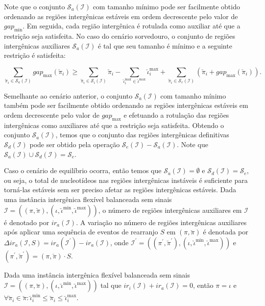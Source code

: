 Note que o conjunto $\mathcal{S}_{a}(\mathcal{I})$ com tamanho mínimo pode ser facilmente obtido ordenando as regiões intergênicas estáveis em ordem decrescente pelo valor de $gap_{\min}$. Em seguida, cada região intergênica é rotulada como auxiliar até que a restrição seja satisfeita. No caso do cenário sorvedouro, o conjunto de regiões intergênicas auxiliares $\mathcal{S}_{a}(\mathcal{I})$ é tal que seu tamanho é mínimo e a seguinte restrição é satisfeita:

$$\sum_{\breve\pi_i \in \mathcal{S}_{a}(\mathcal{I})} gap_{\max}(\breve\pi_i) \ge \sum_{\breve\pi_i \in \mathcal{S}_{i}(\mathcal{I})} \breve\pi_i - \sum_{\breve\iota_{i}^{\max}  \in \breve\iota^{\max}} \breve\iota_{i}^{\max} + \sum_{\breve\pi_i \in \mathcal{S}_{e}(\mathcal{I})} (\breve\pi_i + gap_{\max}(\breve\pi_i)).$$

Semelhante ao cenário anterior, o conjunto $\mathcal{S}_{a}(\mathcal{I})$ com tamanho mínimo também pode ser facilmente obtido ordenando as regiões intergênicas estáveis em ordem decrescente pelo valor de $gap_{\max}$ e efetuando a rotulação das regiões intergênicas como auxiliares até que a restrição seja satisfeita. Obtendo o conjunto $\mathcal{S}_{a}(\mathcal{I})$, temos que o conjunto das regiões intergênicas definitivas $\mathcal{S}_{d}(\mathcal{I})$ pode ser obtido pela operação $\mathcal{S}_{e}(\mathcal{I}) - \mathcal{S}_{a}(\mathcal{I})$. Note que $\mathcal{S}_{a}(\mathcal{I}) \cup \mathcal{S}_{d}(\mathcal{I}) = \mathcal{S}_{e}$.

Caso o cenário de equilíbrio ocorra, então temos que $\mathcal{S}_{a}(\mathcal{I})=\emptyset$ e $ \mathcal{S}_{d}(\mathcal{I}) = \mathcal{S}_{e}$, ou seja, o total de nucleotídeos nas regiões intergênicas instáveis é suficiente para torná-las estáveis sem ser preciso afetar as regiões intergênicas estáveis. Dada uma instância intergênica flexível balanceada sem sinais $\mathcal{I} = ((\pi,\breve\pi),(\iota,\breve\iota^{\min},\breve\iota^{\max}))$, o número de regiões intergênicas auxiliares em $\mathcal{I}$ é denotado por $ir_a(\mathcal{I})$. A variação no número de regiões intergênicas auxiliares após aplicar uma sequência de eventos de rearranjo $S$ em $(\pi,\breve\pi)$ é denotada por $\Delta ir_a(\mathcal{I},S) = ir_a(\mathcal{I}^{\prime}) - ir_a(\mathcal{I})$, onde $\mathcal{I}^{\prime} = ((\pi^{\prime}, \breve\pi^{\prime}),(\iota,\breve\iota^{\min},\breve\iota^{\max}))$ e $(\pi^{\prime}, \breve\pi^{\prime}) = (\pi, \breve\pi) \cdot S$.

\begin{remark}\label{remark:PGEYZJME}
Dada uma instância intergênica flexível balanceada sem sinais $\mathcal{I} = ((\pi,\breve\pi),(\iota,\breve\iota^{\min},\breve\iota^{\max}))$ tal que $ir_i(\mathcal{I}) + ir_a(\mathcal{I}) = 0$, então $\pi = \iota$ e $\forall \breve\pi_i \in \breve\pi: \breve\iota^{\min}_i \le \breve\pi_i \le \breve\iota^{\max}_i$.
\end{remark}

